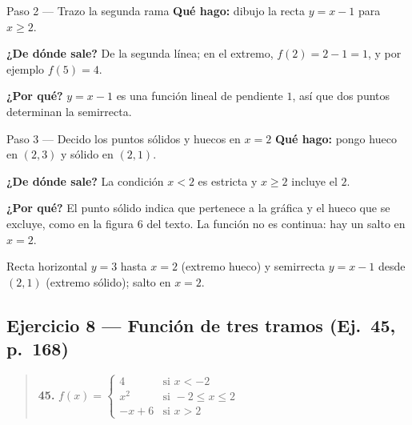 \documentclass[11pt]{article}
\begin{document}
\begin{paso}{Paso 2 --- Trazo la segunda rama}
\textbf{Qué hago:} dibujo la recta $y=x-1$ para $x\ge 2$.

\textbf{¿De dónde sale?} De la segunda línea; en el extremo, $f(2)=2-1=1$, y por ejemplo $f(5)=4$.

\textbf{¿Por qué?} $y=x-1$ es una función lineal de pendiente $1$, así que dos puntos determinan la semirrecta.
\end{paso}

\begin{paso}{Paso 3 --- Decido los puntos sólidos y huecos en $x=2$}
\textbf{Qué hago:} pongo hueco en $(2,3)$ y sólido en $(2,1)$.

\textbf{¿De dónde sale?} La condición $x<2$ es estricta y $x\ge 2$ incluye el $2$.

\textbf{¿Por qué?} El punto sólido indica que pertenece a la gráfica y el hueco que se excluye, como en la figura 6 del texto. La función no es continua: hay un salto en $x=2$.

\begin{center}
\end{center}
\end{paso}

\begin{resp}
Recta horizontal $y=3$ hasta $x=2$ (extremo hueco) y semirrecta $y=x-1$ desde $(2,1)$ (extremo sólido); salto en $x=2$.
\end{resp}

\subsection*{Ejercicio 8 — Función de tres tramos (Ej.~45, p.~168)}

\begin{quote}
\textbf{45.} $f(x)=\begin{cases}4 & \text{si } x<-2\\ x^2 & \text{si } -2\le x\le 2\\ -x+6 & \text{si } x>2\end{cases}$
\end{quote}
\end{document}

